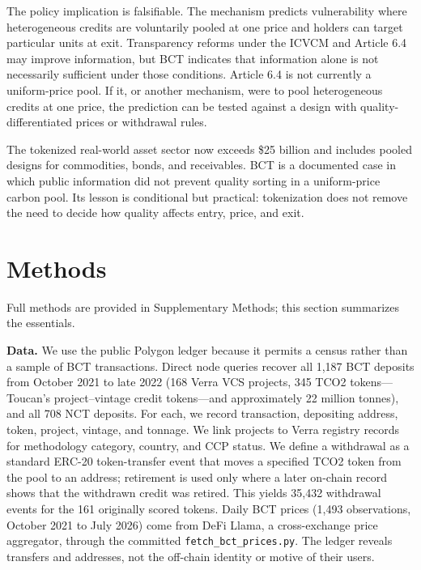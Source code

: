 \documentclass[sn-nature,Numbered]{sn-jnl}
\begin{document}
The policy implication is falsifiable. The mechanism predicts vulnerability where heterogeneous credits are voluntarily pooled at one price and holders can target particular units at exit. Transparency reforms under the ICVCM and Article 6.4 may improve information, but BCT indicates that information alone is not necessarily sufficient under those conditions. Article 6.4 is not currently a uniform-price pool. If it, or another mechanism, were to pool heterogeneous credits at one price, the prediction can be tested against a design with quality-differentiated prices or withdrawal rules.

The tokenized real-world asset sector now exceeds \$25 billion and includes pooled designs for commodities, bonds, and receivables. BCT is a documented case in which public information did not prevent quality sorting in a uniform-price carbon pool. Its lesson is conditional but practical: tokenization does not remove the need to decide how quality affects entry, price, and exit.

\section*{Methods}
Full methods are provided in Supplementary Methods; this section summarizes the essentials.

\textbf{Data.} We use the public Polygon ledger because it permits a census rather than a sample of BCT transactions. Direct node queries recover all 1,187 BCT deposits from October 2021 to late 2022 (168 Verra VCS projects, 345 TCO2 tokens---Toucan's project--vintage credit tokens---and approximately 22 million tonnes), and all 708 NCT deposits. For each, we record transaction, depositing address, token, project, vintage, and tonnage. We link projects to Verra registry records for methodology category, country, and CCP status. We define a withdrawal as a standard ERC-20 token-transfer event that moves a specified TCO2 token from the pool to an address; retirement is used only where a later on-chain record shows that the withdrawn credit was retired. This yields 35,432 withdrawal events for the 161 originally scored tokens. Daily BCT prices (1,493 observations, October 2021 to July 2026) come from DeFi Llama, a cross-exchange price aggregator, through the committed \texttt{fetch\_bct\_prices.py}. The ledger reveals transfers and addresses, not the off-chain identity or motive of their users.
\end{document}
